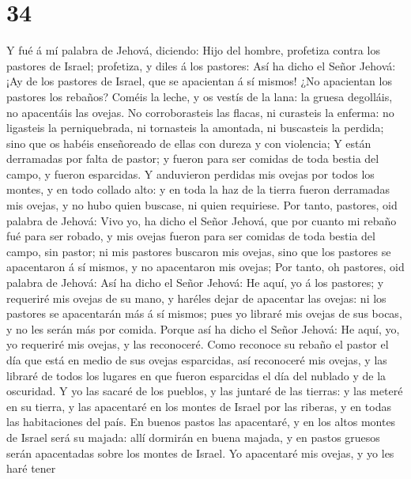 \hypertarget{section-33}{%
\section{34}\label{section-33}}

 Y fué á mí palabra de Jehová, diciendo:  Hijo
del hombre, profetiza contra los pastores de Israel; profetiza, y diles
á los pastores: Así ha dicho el Señor Jehová: ¡Ay de los pastores de
Israel, que se apacientan á sí mismos! ¿No apacientan los pastores los
rebaños?  Coméis la leche, y os vestís de la lana: la gruesa
degolláis, no apacentáis las ovejas.  No corroborasteis las
flacas, ni curasteis la enferma: no ligasteis la perniquebrada, ni
tornasteis la amontada, ni buscasteis la perdida; sino que os habéis
enseñoreado de ellas con dureza y con violencia;  Y están
derramadas por falta de pastor; y fueron para ser comidas de toda bestia
del campo, y fueron esparcidas.  Y anduvieron perdidas mis
ovejas por todos los montes, y en todo collado alto: y en toda la haz de
la tierra fueron derramadas mis ovejas, y no hubo quien buscase, ni
quien requiriese.  Por tanto, pastores, oid palabra de
Jehová:  Vivo yo, ha dicho el Señor Jehová, que por cuanto
mi rebaño fué para ser robado, y mis ovejas fueron para ser comidas de
toda bestia del campo, sin pastor; ni mis pastores buscaron mis ovejas,
sino que los pastores se apacentaron á sí mismos, y no apacentaron mis
ovejas;  Por tanto, oh pastores, oid palabra de Jehová:
 Así ha dicho el Señor Jehová: He aquí, yo á los pastores;
y requeriré mis ovejas de su mano, y haréles dejar de apacentar las
ovejas: ni los pastores se apacentarán más á sí mismos; pues yo libraré
mis ovejas de sus bocas, y no les serán más por comida. 
Porque así ha dicho el Señor Jehová: He aquí, yo, yo requeriré mis
ovejas, y las reconoceré.  Como reconoce su rebaño el
pastor el día que está en medio de sus ovejas esparcidas, así reconoceré
mis ovejas, y las libraré de todos los lugares en que fueron esparcidas
el día del nublado y de la oscuridad.  Y yo las sacaré de
los pueblos, y las juntaré de las tierras: y las meteré en su tierra, y
las apacentaré en los montes de Israel por las riberas, y en todas las
habitaciones del país.  En buenos pastos las apacentaré, y
en los altos montes de Israel será su majada: allí dormirán en buena
majada, y en pastos gruesos serán apacentadas sobre los montes de
Israel.  Yo apacentaré mis ovejas, y yo les haré tener
